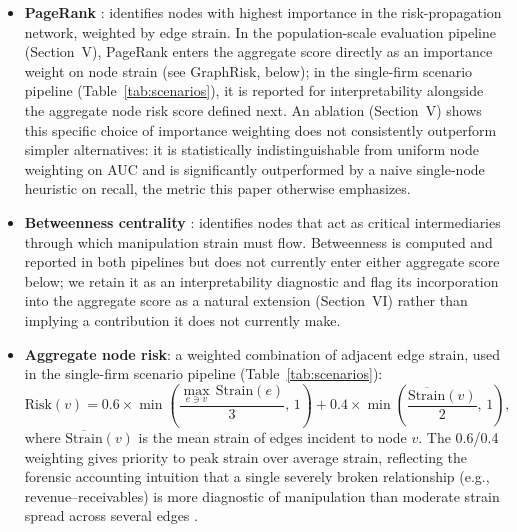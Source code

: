 \documentclass[12pt]{article}
\begin{document}
\begin{itemize}
    \item \textbf{PageRank} \citep{brin1998}: identifies nodes with highest
    importance in the risk-propagation network, weighted by edge strain.
    In the population-scale evaluation pipeline (Section~V), PageRank
    enters the aggregate score directly as an importance weight on node
    strain (see GraphRisk, below); in the single-firm scenario pipeline
    (Table~\ref{tab:scenarios}), it is reported for interpretability
    alongside the aggregate node risk score defined next.  An ablation
    (Section~V) shows this specific choice of importance
    weighting does not consistently outperform simpler alternatives: it
    is statistically indistinguishable from uniform node weighting on
    AUC and is significantly outperformed by a naive single-node
    heuristic on recall, the metric this paper otherwise emphasizes.
    \item \textbf{Betweenness centrality} \citep{freeman1977}: identifies
    nodes that act as critical intermediaries through which manipulation strain
    must flow.  Betweenness is computed and reported in both pipelines but
    does not currently enter either aggregate score below; we retain it
    as an interpretability diagnostic and flag its incorporation into the
    aggregate score as a natural extension (Section~VI) rather than
    implying a contribution it does not currently make.
    \item \textbf{Aggregate node risk}: a weighted combination of adjacent
    edge strain, used in the single-firm scenario pipeline
    (Table~\ref{tab:scenarios}):
    \begin{equation}
        \text{Risk}(v)
        = 0.6\!\times\!\min\!\!\left(\frac{\max_{e \ni v}\,\text{Strain}(e)}{3},\,1\right)
        + 0.4\!\times\!\min\!\!\left(\frac{\overline{\text{Strain}}(v)}{2},\,1\right),
    \end{equation}
    where $\overline{\text{Strain}}(v)$ is the mean strain of edges incident to
    node $v$.  The 0.6/0.4 weighting gives priority to peak strain over
    average strain, reflecting the forensic accounting intuition that a single
    severely broken relationship (e.g., revenue--receivables) is more
    diagnostic of manipulation than moderate strain spread across several
    edges \citep{beneish1999,dechow2011}.
\end{itemize}
\end{document}

